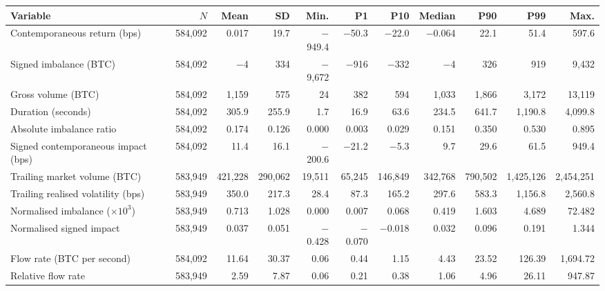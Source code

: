\begin{tabular}{lrrrrrrrrrr}
\toprule
Variable & $N$ & Mean & SD & Min. & P1 & P10 & Median & P90 & P99 & Max. \\
\midrule
Contemporaneous return (bps) & 584,092 & 0.017 & 19.7 & $-$949.4 & $-$50.3 & $-$22.0 & $-$0.064 & 22.1 & 51.4 & 597.6 \\
Signed imbalance (BTC) & 584,092 & $-$4 & 334 & $-$9,672 & $-$916 & $-$332 & $-$4 & 326 & 919 & 9,432 \\
Gross volume (BTC) & 584,092 & 1,159 & 575 & 24 & 382 & 594 & 1,033 & 1,866 & 3,172 & 13,119 \\
Duration (seconds) & 584,092 & 305.9 & 255.9 & 1.7 & 16.9 & 63.6 & 234.5 & 641.7 & 1,190.8 & 4,099.8 \\
Absolute imbalance ratio & 584,092 & 0.174 & 0.126 & 0.000 & 0.003 & 0.029 & 0.151 & 0.350 & 0.530 & 0.895 \\
Signed contemporaneous impact (bps) & 584,092 & 11.4 & 16.1 & $-$200.6 & $-$21.2 & $-$5.3 & 9.7 & 29.6 & 61.5 & 949.4 \\
Trailing market volume (BTC) & 583,949 & 421,228 & 290,062 & 19,511 & 65,245 & 146,849 & 342,768 & 790,502 & 1,425,126 & 2,454,251 \\
Trailing realised volatility (bps) & 583,949 & 350.0 & 217.3 & 28.4 & 87.3 & 165.2 & 297.6 & 583.3 & 1,156.8 & 2,560.8 \\
Normalised imbalance ($\times 10^{3}$) & 583,949 & 0.713 & 1.028 & 0.000 & 0.007 & 0.068 & 0.419 & 1.603 & 4.689 & 72.482 \\
Normalised signed impact & 583,949 & 0.037 & 0.051 & $-$0.428 & $-$0.070 & $-$0.018 & 0.032 & 0.096 & 0.191 & 1.344 \\
Flow rate (BTC per second) & 584,092 & 11.64 & 30.37 & 0.06 & 0.44 & 1.15 & 4.43 & 23.52 & 126.39 & 1,694.72 \\
Relative flow rate & 583,949 & 2.59 & 7.87 & 0.06 & 0.21 & 0.38 & 1.06 & 4.96 & 26.11 & 947.87 \\
\bottomrule
\end{tabular}
